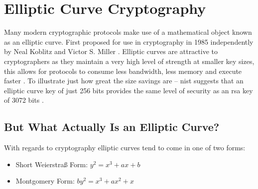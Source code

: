 \clearpage

\section{Elliptic Curve Cryptography}
Many modern cryptographic protocols make use of a mathematical object known as an elliptic curve.
First proposed for use in cryptography in 1985 independently by Neal Koblitz \cite{ecc-first-use-koblitz} and Victor S. Miller \cite{ecc-first-use-miller}.
Elliptic curves are attractive to cryptographers as they maintain a very high level of strength at smaller key sizes, this allows for protocols to consume less bandwidth, less memory and execute faster \cite{state-of-ecc}.
To illustrate just how great the size savings are -- \gls{nist} suggests that an elliptic curve key of just 256 bits provides the same level of security as an \gls{rsa} key of 3072 bits \cite{nist-ecc-reqs}.

\subsection{But What Actually Is an Elliptic Curve?}
With regards to cryptography elliptic curves tend to come in one of two forms:
\begin{itemize}
  \item Short Weierstra\ss{} Form: $y^2 = x^3 + ax + b$
  \item Montgomery Form: $by^2 = x^3 + ax^2 + x$
\end{itemize}


